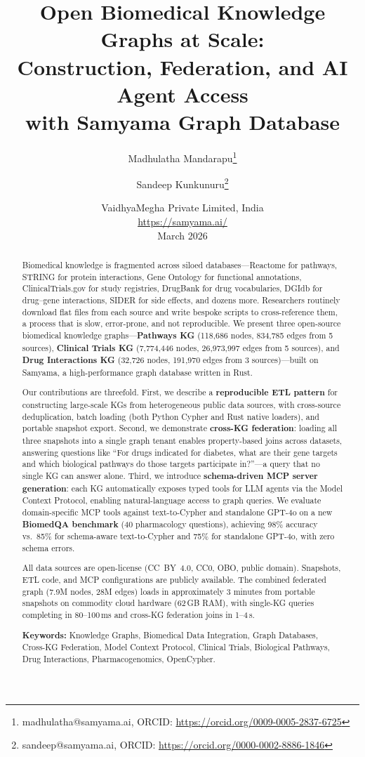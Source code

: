 \documentclass[11pt]{article}
\title{Open Biomedical Knowledge Graphs at Scale:\\Construction, Federation, and AI Agent Access\\with Samyama Graph Database}
\author{
  Madhulatha Mandarapu\thanks{madhulatha@samyama.ai, ORCID: \url{https://orcid.org/0009-0005-2837-6725}} \and
  Sandeep Kunkunuru\thanks{sandeep@samyama.ai, ORCID: \url{https://orcid.org/0000-0002-8886-1846}}
}
\date{%
  VaidhyaMegha Private Limited, India\\[2pt]
  \url{https://samyama.ai/}\\[8pt]
  March 2026
}
\begin{document}
\maketitle

\begin{abstract}
Biomedical knowledge is fragmented across siloed databases---Reactome for pathways, STRING for protein interactions, Gene Ontology for functional annotations, ClinicalTrials.gov for study registries, DrugBank for drug vocabularies, DGIdb for drug--gene interactions, SIDER for side effects, and dozens more. Researchers routinely download flat files from each source and write bespoke scripts to cross-reference them, a process that is slow, error-prone, and not reproducible. We present three open-source biomedical knowledge graphs---\textbf{Pathways KG} (118,686 nodes, 834,785 edges from 5 sources), \textbf{Clinical Trials KG} (7,774,446 nodes, 26,973,997 edges from 5 sources), and \textbf{Drug Interactions KG} (32,726 nodes, 191,970 edges from 3 sources)---built on Samyama, a high-performance graph database written in Rust.

Our contributions are threefold. First, we describe a \textbf{reproducible ETL pattern} for constructing large-scale KGs from heterogeneous public data sources, with cross-source deduplication, batch loading (both Python Cypher and Rust native loaders), and portable snapshot export. Second, we demonstrate \textbf{cross-KG federation}: loading all three snapshots into a single graph tenant enables property-based joins across datasets, answering questions like ``For drugs indicated for diabetes, what are their gene targets and which biological pathways do those targets participate in?''---a query that no single KG can answer alone. Third, we introduce \textbf{schema-driven MCP server generation}: each KG automatically exposes typed tools for LLM agents via the Model Context Protocol, enabling natural-language access to graph queries. We evaluate domain-specific MCP tools against text-to-Cypher and standalone GPT-4o on a new \textbf{BiomedQA benchmark} (40 pharmacology questions), achieving 98\% accuracy vs.\ 85\% for schema-aware text-to-Cypher and 75\% for standalone GPT-4o, with zero schema errors.

All data sources are open-license (CC~BY~4.0, CC0, OBO, public domain). Snapshots, ETL code, and MCP configurations are publicly available. The combined federated graph (7.9M nodes, 28M edges) loads in approximately 3 minutes from portable snapshots on commodity cloud hardware (62\,GB RAM), with single-KG queries completing in 80--100\,ms and cross-KG federation joins in 1--4\,s.

\noindent\textbf{Keywords:} Knowledge Graphs, Biomedical Data Integration, Graph Databases, Cross-KG Federation, Model Context Protocol, Clinical Trials, Biological Pathways, Drug Interactions, Pharmacogenomics, OpenCypher.
\end{abstract}
\end{document}
